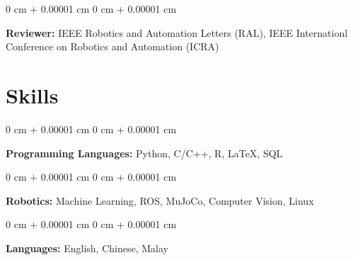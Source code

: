 \documentclass[10pt, letterpaper]{article}
\newenvironment{onecolentry}{
    \begin{adjustwidth}{
        0 cm + 0.00001 cm
    }{
        0 cm + 0.00001 cm
    }
}{
    \end{adjustwidth}
} %
\begin{document}
        
        \begin{onecolentry}
            \textbf{Reviewer:} IEEE Robotics and Automation Letters (RAL), IEEE Internationl Conference on Robotics and Automation (ICRA)
        \end{onecolentry}


    
    \section{Skills}



        
        \begin{onecolentry}
            \textbf{Programming Languages:} Python, C/C++, R, LaTeX, SQL
        \end{onecolentry}

        \vspace{0.2 cm}

        \begin{onecolentry}
            \textbf{Robotics:} Machine Learning, ROS, MuJoCo, Computer Vision, Linux
        \end{onecolentry}

        \vspace{0.2 cm}

        \begin{onecolentry}
            \textbf{Languages:} English, Chinese, Malay
        \end{onecolentry}


    
\end{document}

